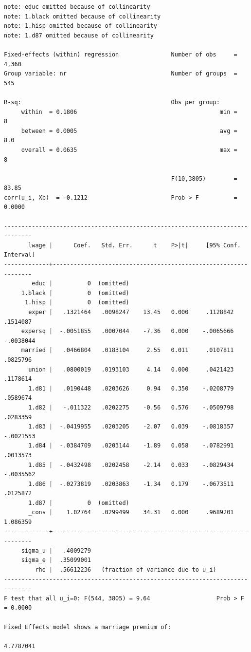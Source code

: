 \documentclass[
]{book}
\begin{document}
\begin{verbatim}
note: educ omitted because of collinearity
note: 1.black omitted because of collinearity
note: 1.hisp omitted because of collinearity
note: 1.d87 omitted because of collinearity

Fixed-effects (within) regression               Number of obs     =      4,360
Group variable: nr                              Number of groups  =        545

R-sq:                                           Obs per group:
     within  = 0.1806                                         min =          8
     between = 0.0005                                         avg =        8.0
     overall = 0.0635                                         max =          8

                                                F(10,3805)        =      83.85
corr(u_i, Xb)  = -0.1212                        Prob > F          =     0.0000

------------------------------------------------------------------------------
       lwage |      Coef.   Std. Err.      t    P>|t|     [95% Conf. Interval]
-------------+----------------------------------------------------------------
        educ |          0  (omitted)
     1.black |          0  (omitted)
      1.hisp |          0  (omitted)
       exper |   .1321464   .0098247    13.45   0.000     .1128842    .1514087
     expersq |  -.0051855   .0007044    -7.36   0.000    -.0065666   -.0038044
     married |   .0466804   .0183104     2.55   0.011     .0107811    .0825796
       union |   .0800019   .0193103     4.14   0.000     .0421423    .1178614
       1.d81 |   .0190448   .0203626     0.94   0.350    -.0208779    .0589674
       1.d82 |   -.011322   .0202275    -0.56   0.576    -.0509798    .0283359
       1.d83 |  -.0419955   .0203205    -2.07   0.039    -.0818357   -.0021553
       1.d84 |  -.0384709   .0203144    -1.89   0.058    -.0782991    .0013573
       1.d85 |  -.0432498   .0202458    -2.14   0.033    -.0829434   -.0035562
       1.d86 |  -.0273819   .0203863    -1.34   0.179    -.0673511    .0125872
       1.d87 |          0  (omitted)
       _cons |    1.02764   .0299499    34.31   0.000     .9689201    1.086359
-------------+----------------------------------------------------------------
     sigma_u |   .4009279
     sigma_e |  .35099001
         rho |  .56612236   (fraction of variance due to u_i)
------------------------------------------------------------------------------
F test that all u_i=0: F(544, 3805) = 9.64                   Prob > F = 0.0000

Fixed Effects model shows a marriage premium of:

4.7787041
\end{verbatim}
\end{document}

